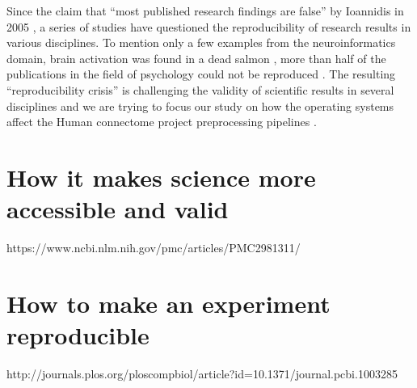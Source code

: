 Since the claim that ``most published research findings are false” by Ioannidis in 2005 \cite{10.1371/journal.pmed.0020124}, a series of studies have questioned the reproducibility of research results in various disciplines. To mention only a few examples from the neuroinformatics domain, brain activation was found in a dead salmon \cite{BENNETT2009S125}, more than half of the publications in the field of psychology could not be reproduced \cite{aac4716}. The resulting “reproducibility crisis” is challenging the validity of scientific results in several disciplines and we are trying to focus our study on how the operating systems affect the Human connectome project preprocessing pipelines \cite{Gla13}.

\section{How it makes science more accessible and valid}
https://www.ncbi.nlm.nih.gov/pmc/articles/PMC2981311/
\section{How to make an experiment reproducible}
http://journals.plos.org/ploscompbiol/article?id=10.1371/journal.pcbi.1003285

